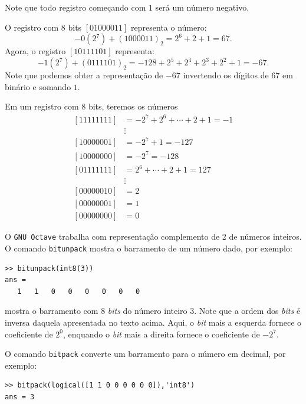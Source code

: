 \begin{obs}
  Note que todo registro começando com $1$ será um número negativo.  
\end{obs}


\begin{ex}
 O registro com $8$ bits $[01000011]$ representa o número:
 \begin{equation*}
   -0(2^7) + (1000011)_2 = 2^6 + 2 + 1 = 67.
 \end{equation*}
 Agora, o registro $[10111101]$ representa:
 \begin{equation*}
   -1(2^7) + (0111101)_2 = -128 + 2^5 + 2^4 + 2^3 + 2^2 + 1 = -67.
 \end{equation*}
 Note que podemos obter a representação de $-67$ invertendo os dígitos de $67$ em binário e somando $1$.
\end{ex}

\begin{ex}
Em um registro com $8$ bits, teremos os números
\begin{equation*}
  \begin{split}
    [11111111] &= -2^7+2^{6}+\cdots+2+1=-1\\
    &\vdots   \\
    [10000001] &= -2^7+1 = -127 \\
    [10000000] &= -2^7   = -128 \\
    [01111111] &= 2^6+\cdots+2+1=127 \\
    &\vdots   \\
    [00000010] &= 2 \\
    [00000001] &= 1 \\
    [00000000] &= 0
  \end{split}
\end{equation*}

\ifisoctave
O \verb+GNU Octave+ trabalha com representação complemento de 2 de números inteiros. O comando \verb+bitunpack+ mostra o barramento de um número dado, por exemplo:
\begin{verbatim}
>> bitunpack(int8(3))
ans =
   1   1   0   0   0   0   0   0
\end{verbatim}
mostra o barramento com $8$ \emph{bits} do número inteiro $3$. Note que a ordem dos \emph{bits} é inversa daquela apresentada no texto acima. Aqui, o \emph{bit} mais a esquerda fornece o coeficiente de $2^0$, enquando o \emph{bit} mais a direita fornece o coeficiente de $-2^7$.

O comando \verb+bitpack+ converte um barramento para o número em decimal, por exemplo:
\begin{verbatim}
>> bitpack(logical([1 1 0 0 0 0 0 0]),'int8')
ans = 3
\end{verbatim}
\fi
\end{ex}

